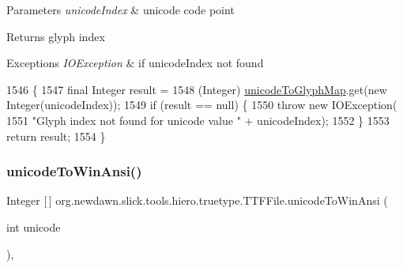 \begin{DoxyParams}{Parameters}
{\em unicode\+Index} & unicode code point \\
\hline
\end{DoxyParams}
\begin{DoxyReturn}{Returns}
glyph index 
\end{DoxyReturn}

\begin{DoxyExceptions}{Exceptions}
{\em I\+O\+Exception} & if unicode\+Index not found \\
\hline
\end{DoxyExceptions}

\begin{DoxyCode}
1546                                                                         \{
1547         \textcolor{keyword}{final} Integer result = 
1548             (Integer) \mbox{\hyperlink{classorg_1_1newdawn_1_1slick_1_1tools_1_1hiero_1_1truetype_1_1_t_t_f_file_aed6e18e72b615365a255756b1ff20967}{unicodeToGlyphMap}}.get(\textcolor{keyword}{new} Integer(unicodeIndex));
1549         \textcolor{keywordflow}{if} (result == null) \{
1550             \textcolor{keywordflow}{throw} \textcolor{keyword}{new} IOException(
1551                     \textcolor{stringliteral}{"Glyph index not found for unicode value "} + unicodeIndex);
1552         \}
1553         \textcolor{keywordflow}{return} result;
1554     \}
\end{DoxyCode}
\mbox{\label{classorg_1_1newdawn_1_1slick_1_1tools_1_1hiero_1_1truetype_1_1_t_t_f_file_a20efa0bc697dd6dedcaa08b66eaa4660}} 
\subsubsection{\texorpdfstring{unicode\+To\+Win\+Ansi()}{unicodeToWinAnsi()}}
{\footnotesize\ttfamily Integer \mbox{[}$\,$\mbox{]} org.\+newdawn.\+slick.\+tools.\+hiero.\+truetype.\+T\+T\+F\+File.\+unicode\+To\+Win\+Ansi (\begin{DoxyParamCaption}\item[{int}]{unicode }\end{DoxyParamCaption})\hspace{0.3cm}{\ttfamily [inline]}, {\ttfamily [private]}}

